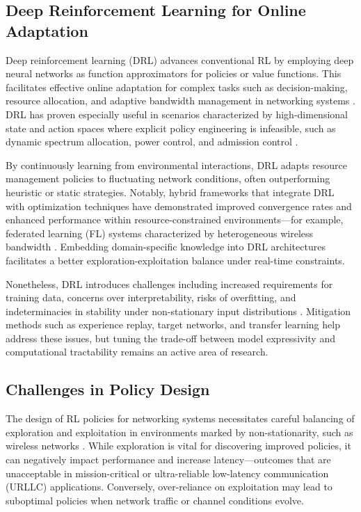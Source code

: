 \subsection{Deep Reinforcement Learning for Online Adaptation}

Deep reinforcement learning (DRL) advances conventional RL by employing deep neural networks as function approximators for policies or value functions. This facilitates effective online adaptation for complex tasks such as decision-making, resource allocation, and adaptive bandwidth management in networking systems \cite{ref4,ref8,ref13,ref15,ref50}. DRL has proven especially useful in scenarios characterized by high-dimensional state and action spaces where explicit policy engineering is infeasible, such as dynamic spectrum allocation, power control, and admission control \cite{ref4,ref8}.

By continuously learning from environmental interactions, DRL adapts resource management policies to fluctuating network conditions, often outperforming heuristic or static strategies. Notably, hybrid frameworks that integrate DRL with optimization techniques have demonstrated improved convergence rates and enhanced performance within resource-constrained environments—for example, federated learning (FL) systems characterized by heterogeneous wireless bandwidth \cite{ref50}. Embedding domain-specific knowledge into DRL architectures facilitates a better exploration-exploitation balance under real-time constraints.

Nonetheless, DRL introduces challenges including increased requirements for training data, concerns over interpretability, risks of overfitting, and indeterminacies in stability under non-stationary input distributions \cite{ref13}. Mitigation methods such as experience replay, target networks, and transfer learning help address these issues, but tuning the trade-off between model expressivity and computational tractability remains an active area of research.

\subsection{Challenges in Policy Design}

The design of RL policies for networking systems necessitates careful balancing of exploration and exploitation in environments marked by non-stationarity, such as wireless networks \cite{ref3,ref6,ref14,ref48}. While exploration is vital for discovering improved policies, it can negatively impact performance and increase latency—outcomes that are unacceptable in mission-critical or ultra-reliable low-latency communication (URLLC) applications. Conversely, over-reliance on exploitation may lead to suboptimal policies when network traffic or channel conditions evolve.

